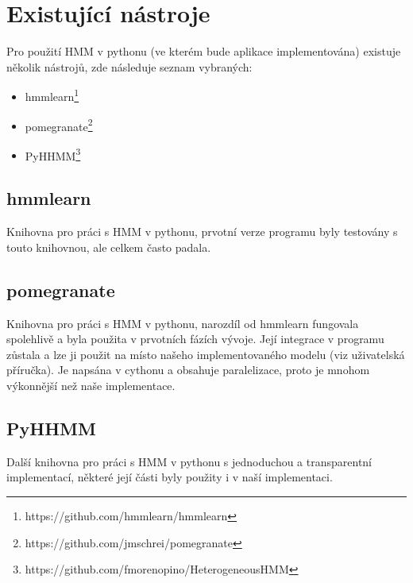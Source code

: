 \section{Existující nástroje}

Pro použití HMM v pythonu (ve kterém bude aplikace implementována) existuje několik nástrojů, zde následuje seznam vybraných:

\begin{itemize}
    \item hmmlearn\footnote{https://github.com/hmmlearn/hmmlearn}
    \item pomegranate\footnote{https://github.com/jmschrei/pomegranate}
    \item PyHHMM\footnote{https://github.com/fmorenopino/HeterogeneousHMM}
\end{itemize}

\subsection{hmmlearn}
Knihovna pro práci s HMM v pythonu, prvotní verze programu byly testovány s touto knihovnou, ale celkem často padala.

\subsection{pomegranate}
Knihovna pro práci s HMM v pythonu, narozdíl od hmmlearn fungovala spolehlivě a byla použita v prvotních fázích vývoje.
Její integrace v programu zůstala a lze ji použit na místo našeho implementovaného modelu (viz uživatelská příručka).
Je napsána v cythonu a obsahuje paralelizace, proto je mnohom výkonnější než naše implementace.

\subsection{PyHHMM}
Další knihovna pro práci s HMM v pythonu s jednoduchou a transparentní implementací, některé její části byly použity i v naší implementaci.


\clearpage
